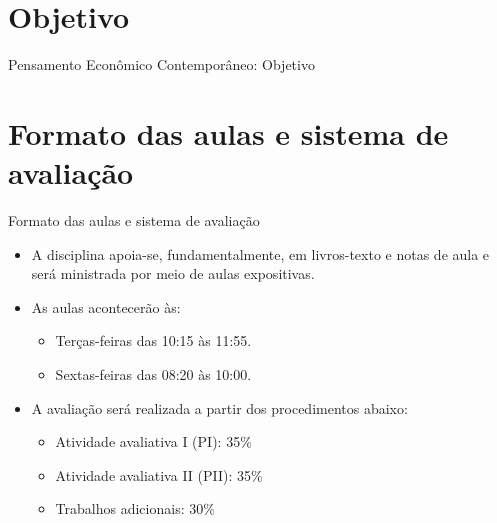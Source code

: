 \documentclass[10pt]{beamer}
\begin{document}
\section{Objetivo}
\begin{frame}{Pensamento Econômico Contemporâneo: Objetivo}
    \begin{center}
        \begin{minipage}{.8\textwidth}
        \end{minipage}
    \end{center}
\end{frame}

\section{Formato das aulas e sistema de avaliação}
\begin{frame}{Formato das aulas e sistema de avaliação}
    \begin{itemize}
        \item A disciplina apoia-se, fundamentalmente, em livros-texto e notas de aula e será ministrada por meio de aulas expositivas.\bigskip

        \item As aulas acontecerão às:\medskip
              \begin{itemize}
                  \item Terças-feiras das 10:15 às 11:55.\medskip
                  \item Sextas-feiras das 08:20 às 10:00.\bigskip
              \end{itemize}

        \item A avaliação será realizada a partir dos procedimentos abaixo:\medskip
              \begin{itemize}
                  \item Atividade avaliativa I (PI): 35\%\medskip
                  \item Atividade avaliativa II (PII): 35\%\medskip                  
                  \item Trabalhos adicionais: 30\%
              \end{itemize}
    \end{itemize}
\end{frame}
\end{document}

